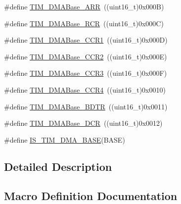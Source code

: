 \begin{DoxyCompactItemize}
\#define \hyperlink{group___t_i_m___d_m_a___base__address_gaab8a66f70e59b5916b4bba344746d652}{T\+I\+M\+\_\+\+D\+M\+A\+Base\+\_\+\+A\+RR}~((uint16\+\_\+t)0x000\+B)
\item 
\#define \hyperlink{group___t_i_m___d_m_a___base__address_ga97f9edceee5c99b32aaa2c6daf849b7d}{T\+I\+M\+\_\+\+D\+M\+A\+Base\+\_\+\+R\+CR}~((uint16\+\_\+t)0x000\+C)
\item 
\#define \hyperlink{group___t_i_m___d_m_a___base__address_ga235a47fa47fd19594a111e6e48c0d5a2}{T\+I\+M\+\_\+\+D\+M\+A\+Base\+\_\+\+C\+C\+R1}~((uint16\+\_\+t)0x000\+D)
\item 
\#define \hyperlink{group___t_i_m___d_m_a___base__address_ga0e2150dcd3afe31ecb793aa471b3b972}{T\+I\+M\+\_\+\+D\+M\+A\+Base\+\_\+\+C\+C\+R2}~((uint16\+\_\+t)0x000\+E)
\item 
\#define \hyperlink{group___t_i_m___d_m_a___base__address_ga590c90085bd2b206b941dff2731fed74}{T\+I\+M\+\_\+\+D\+M\+A\+Base\+\_\+\+C\+C\+R3}~((uint16\+\_\+t)0x000\+F)
\item 
\#define \hyperlink{group___t_i_m___d_m_a___base__address_ga5e84a16e7d8ea369a3a55bb6fe1f2171}{T\+I\+M\+\_\+\+D\+M\+A\+Base\+\_\+\+C\+C\+R4}~((uint16\+\_\+t)0x0010)
\item 
\#define \hyperlink{group___t_i_m___d_m_a___base__address_gaaff22bbf3091c47783c1c68b648c8605}{T\+I\+M\+\_\+\+D\+M\+A\+Base\+\_\+\+B\+D\+TR}~((uint16\+\_\+t)0x0011)
\item 
\#define \hyperlink{group___t_i_m___d_m_a___base__address_ga59e2206e4e03b9d55c9fb5a24e29b01c}{T\+I\+M\+\_\+\+D\+M\+A\+Base\+\_\+\+D\+CR}~((uint16\+\_\+t)0x0012)
\item 
\#define \hyperlink{group___t_i_m___d_m_a___base__address_gaf565551f2619b1368fed7ef1ba7414de}{I\+S\+\_\+\+T\+I\+M\+\_\+\+D\+M\+A\+\_\+\+B\+A\+SE}(B\+A\+SE)
\end{DoxyCompactItemize}


\subsection{Detailed Description}


\subsection{Macro Definition Documentation}
\mbox{\label{group___t_i_m___d_m_a___base__address_gaf565551f2619b1368fed7ef1ba7414de}} 
